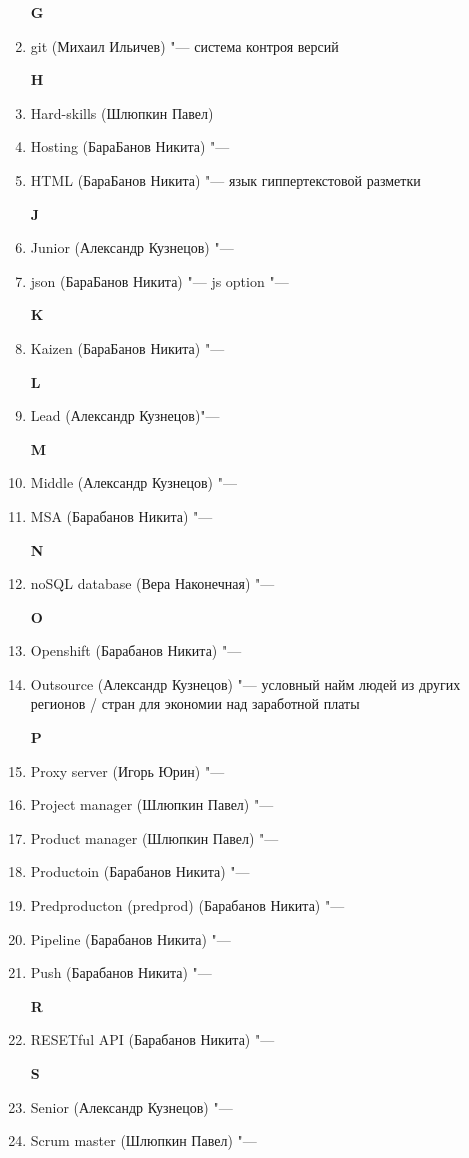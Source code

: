 \documentclass{article}
\begin{document}
\begin{enumerate}
    \textbf{G}
    \item {git (Михаил Ильичев) "--- система контроя версий}

    \textbf{H}
    \item {Hard-skills (Шлюпкин Павел)}
    \item {Hosting (БараБанов Никита) "---}
    \item {HTML (БараБанов Никита) "--- язык гиппертекстовой разметки}

    \textbf{J}
    \item {Junior (Александр Кузнецов) "---}
    \item {json (БараБанов Никита) "--- js option "---}

    \textbf{K}
    \item {Kaizen (БараБанов Никита) "---}

    \textbf{L}
    \item {Lead (Александр Кузнецов)"---}

    \textbf{M}
    \item {Middle (Александр Кузнецов) "---}
    \item {MSA (Барабанов Никита) "---}

    \textbf{N}
    \item {noSQL database (Вера Наконечная) "---}

    \textbf{O}
    \item {Openshift (Барабанов Никита) "---}
    \item {Outsource (Александр Кузнецов) "--- условный найм людей из других регионов / стран для экономии над заработной платы}

    \textbf{P}
    
    \item {Proxy server (Игорь Юрин) "---}
    \item {Project manager (Шлюпкин Павел) "---}
    \item {Product manager (Шлюпкин Павел) "---}
    \item {Productoin (Барабанов Никита) "---}
    \item {Predproducton (predprod) (Барабанов Никита) "---}
    \item {Pipeline (Барабанов Никита) "--- }
    \item {Push (Барабанов Никита) "---}
    
    
    \textbf{R}
    \item {RESETful API (Барабанов Никита) "--- }

    \textbf{S}
    \item {Senior (Александр Кузнецов) "---}
    \item {Scrum master (Шлюпкин Павел) "---}
    

\end{enumerate}
\end{document}
